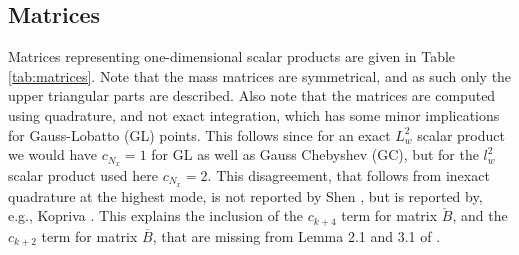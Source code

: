 \documentclass[preprint]{elsarticle}
\newcommand{\N}[1]{\check{#1}}
\newcommand{\D}[1]{\overline{#1}}
\begin{document}
%	    
%		
%		

\subsection*{Matrices}

Matrices representing one-dimensional scalar products are given in Table \ref{tab:matrices}. Note that the mass matrices are symmetrical, and as such only the upper triangular parts are described. Also note that the matrices are computed using quadrature, and not exact integration, which has some minor implications for Gauss-Lobatto (GL) points. This follows since for an exact $L^2_w$ scalar product we would have $c_{N_x}=1$ for GL as well as Gauss Chebyshev (GC), but for the $l^2_w$ scalar product used here $c_{N_x}=2$. This disagreement, that follows from inexact quadrature at the highest mode, is not reported by Shen \cite{Shen95}, but is reported by, e.g., Kopriva \cite{kopriva09}. This explains the inclusion of the $c_{k+4}$ term for matrix $\N{B}$, and the $c_{k+2}$ term for matrix $\D{B}$, that are missing from Lemma 2.1 and 3.1 of \cite{Shen95}.
\end{document}
